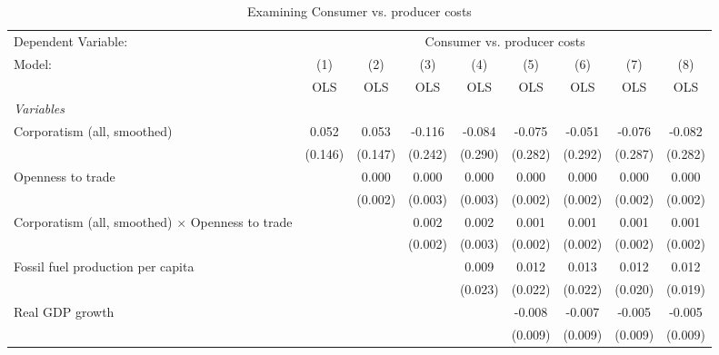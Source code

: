 
\begin{table}[htbp]
   \caption{Examining Consumer vs. producer costs}
   \centering
   \begin{tabular}{lcccccccc}
      \toprule
      Dependent Variable: & \multicolumn{8}{c}{Consumer vs. producer costs}\\
      Model:                                                  & (1)     & (2)     & (3)     & (4)     & (5)     & (6)     & (7)     & (8)\\  
                                                              &  OLS    & OLS     & OLS     & OLS     & OLS     & OLS     & OLS     & OLS\\  
      \midrule
      \emph{Variables}\\
      Corporatism (all, smoothed)                             & 0.052   & 0.053   & -0.116  & -0.084  & -0.075  & -0.051  & -0.076  & -0.082\\   
                                                              & (0.146) & (0.147) & (0.242) & (0.290) & (0.282) & (0.292) & (0.287) & (0.282)\\   
      Openness to trade                                       &         & 0.000   & 0.000   & 0.000   & 0.000   & 0.000   & 0.000   & 0.000\\   
                                                              &         & (0.002) & (0.003) & (0.003) & (0.002) & (0.002) & (0.002) & (0.002)\\   
      Corporatism (all, smoothed) $\times$ Openness to trade  &         &         & 0.002   & 0.002   & 0.001   & 0.001   & 0.001   & 0.001\\   
                                                              &         &         & (0.002) & (0.003) & (0.002) & (0.002) & (0.002) & (0.002)\\   
      Fossil fuel production per capita                       &         &         &         & 0.009   & 0.012   & 0.013   & 0.012   & 0.012\\   
                                                              &         &         &         & (0.023) & (0.022) & (0.022) & (0.020) & (0.019)\\   
      Real GDP growth                                         &         &         &         &         & -0.008  & -0.007  & -0.005  & -0.005\\   
                                                              &         &         &         &         & (0.009) & (0.009) & (0.009) & (0.009)\\   

\end{tabular}
\end{table}
